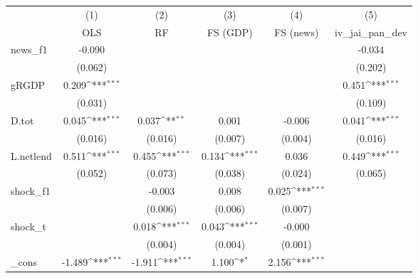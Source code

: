 {
\def\sym#1{\ifmmode^{#1}\else\(^{#1}\)\fi}
\begin{tabular}{l*{5}{c}}
\toprule
            &\multicolumn{1}{c}{(1)}&\multicolumn{1}{c}{(2)}&\multicolumn{1}{c}{(3)}&\multicolumn{1}{c}{(4)}&\multicolumn{1}{c}{(5)}\\
            &\multicolumn{1}{c}{OLS}&\multicolumn{1}{c}{RF}&\multicolumn{1}{c}{FS (GDP)}&\multicolumn{1}{c}{FS (news)}&\multicolumn{1}{c}{iv\_jai\_pan\_dev}\\
\midrule
news\_f1     &      -0.090         &                     &                     &                     &      -0.034         \\
            &     (0.062)         &                     &                     &                     &     (0.202)         \\
\addlinespace
gRGDP       &       0.209\sym{***}&                     &                     &                     &       0.451\sym{***}\\
            &     (0.031)         &                     &                     &                     &     (0.109)         \\
\addlinespace
D.tot       &       0.045\sym{***}&       0.037\sym{**} &       0.001         &      -0.006         &       0.041\sym{***}\\
            &     (0.016)         &     (0.016)         &     (0.007)         &     (0.004)         &     (0.016)         \\
\addlinespace
L.netlend   &       0.511\sym{***}&       0.455\sym{***}&       0.134\sym{***}&       0.036         &       0.449\sym{***}\\
            &     (0.052)         &     (0.073)         &     (0.038)         &     (0.024)         &     (0.065)         \\
\addlinespace
shock\_f1    &                     &      -0.003         &       0.008         &       0.025\sym{***}&                     \\
            &                     &     (0.006)         &     (0.006)         &     (0.007)         &                     \\
\addlinespace
shock\_t     &                     &       0.018\sym{***}&       0.043\sym{***}&      -0.000         &                     \\
            &                     &     (0.004)         &     (0.004)         &     (0.001)         &                     \\
\addlinespace
\_cons      &      -1.489\sym{***}&      -1.911\sym{***}&       1.100\sym{*}  &       2.156\sym{***}&                     \\

\end{tabular}}
